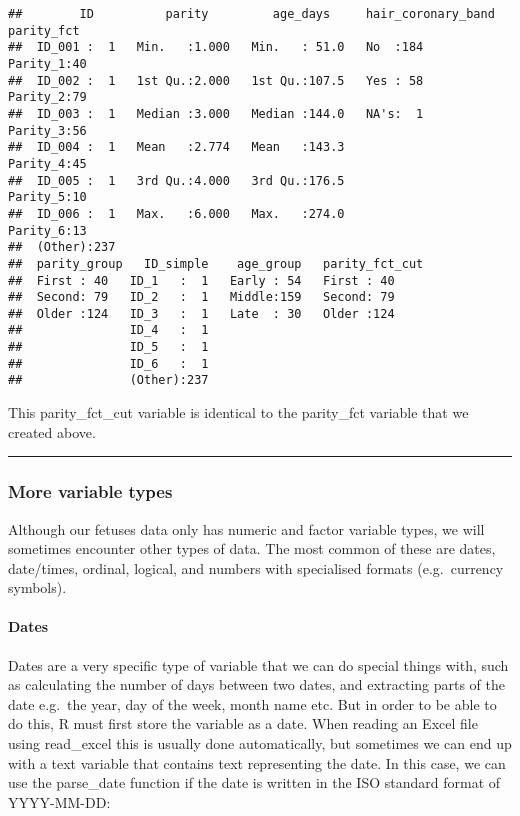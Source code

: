 \documentclass[
]{article}
\begin{document}
\begin{verbatim}
##        ID          parity         age_days     hair_coronary_band    parity_fct
##  ID_001 :  1   Min.   :1.000   Min.   : 51.0   No  :184           Parity_1:40  
##  ID_002 :  1   1st Qu.:2.000   1st Qu.:107.5   Yes : 58           Parity_2:79  
##  ID_003 :  1   Median :3.000   Median :144.0   NA's:  1           Parity_3:56  
##  ID_004 :  1   Mean   :2.774   Mean   :143.3                      Parity_4:45  
##  ID_005 :  1   3rd Qu.:4.000   3rd Qu.:176.5                      Parity_5:10  
##  ID_006 :  1   Max.   :6.000   Max.   :274.0                      Parity_6:13  
##  (Other):237                                                                   
##  parity_group   ID_simple    age_group   parity_fct_cut
##  First : 40   ID_1   :  1   Early : 54   First : 40    
##  Second: 79   ID_2   :  1   Middle:159   Second: 79    
##  Older :124   ID_3   :  1   Late  : 30   Older :124    
##               ID_4   :  1                              
##               ID_5   :  1                              
##               ID_6   :  1                              
##               (Other):237
\end{verbatim}

This parity\_fct\_cut variable is identical to the parity\_fct variable
that we created above.

\begin{center}\rule{0.5\linewidth}{0.5pt}\end{center}

\hypertarget{more-variable-types}{%
\subsubsection{More variable types}\label{more-variable-types}}

Although our fetuses data only has numeric and factor variable types, we
will sometimes encounter other types of data. The most common of these
are dates, date/times, ordinal, logical, and numbers with specialised
formats (e.g.~currency symbols).

\hypertarget{dates}{%
\paragraph{Dates}\label{dates}}

Dates are a very specific type of variable that we can do special things
with, such as calculating the number of days between two dates, and
extracting parts of the date e.g.~the year, day of the week, month name
etc. But in order to be able to do this, R must first store the variable
as a date. When reading an Excel file using read\_excel this is usually
done automatically, but sometimes we can end up with a text variable
that contains text representing the date. In this case, we can use the
parse\_date function if the date is written in the ISO standard format
of YYYY-MM-DD:
\end{document}
